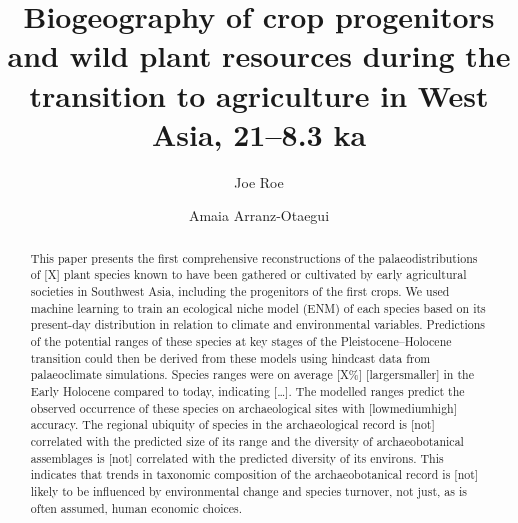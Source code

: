 \documentclass[
  number,
  review]{elsarticle}
\begin{document}
\begin{frontmatter}
\title{Biogeography of crop progenitors and wild plant resources during
the transition to agriculture in West Asia, 21--8.3 ka}
\author[1,2]{Joe Roe%
%
}
\author[3]{Amaia Arranz-Otaegui%
%
}





        
\begin{abstract}
This paper presents the first comprehensive reconstructions of the
palaeodistributions of {[}X{]} plant species known to have been gathered
or cultivated by early agricultural societies in Southwest Asia,
including the progenitors of the first crops. We used machine learning
to train an ecological niche model (ENM) of each species based on its
present-day distribution in relation to climate and environmental
variables. Predictions of the potential ranges of these species at key
stages of the Pleistocene--Holocene transition could then be derived
from these models using hindcast data from palaeoclimate simulations.
Species ranges were on average {[}X\%{]} {[}larger\textbar smaller{]} in
the Early Holocene compared to today, indicating {[}\ldots{]}. The
modelled ranges predict the observed occurrence of these species on
archaeological sites with {[}low\textbar medium\textbar high{]}
accuracy. The regional ubiquity of species in the archaeological record
is {[}not{]} correlated with the predicted size of its range and the
diversity of archaeobotanical assemblages is {[}not{]} correlated with
the predicted diversity of its environs. This indicates that trends in
taxonomic composition of the archaeobotanical record is {[}not{]} likely
to be influenced by environmental change and species turnover, not just,
as is often assumed, human economic choices.
\end{abstract}





\end{frontmatter}
    
\end{document}
